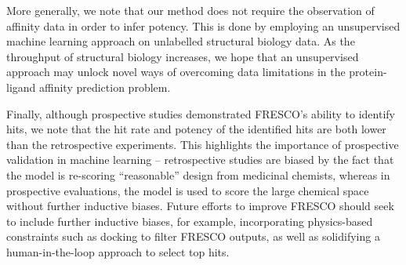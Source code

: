 
More generally, we note that our method does not require the observation of affinity data in order to infer potency. This is done by employing an unsupervised machine learning approach on unlabelled structural biology data. As the throughput of structural biology increases, we hope that an unsupervised approach may unlock novel ways of overcoming data limitations in the protein-ligand affinity prediction problem.

Finally, although prospective studies demonstrated FRESCO's ability to identify hits, we note that the hit rate and potency of the identified hits are both lower than the retrospective experiments. This highlights the importance of prospective validation in machine learning -- retrospective studies are biased by the fact that the model is re-scoring ``reasonable'' design from medicinal chemists, whereas in prospective evaluations, the model is used to score the large chemical space without further inductive biases. Future efforts to improve FRESCO should seek to include further inductive biases, for example, incorporating physics-based constraints such as docking to filter FRESCO outputs, as well as solidifying a human-in-the-loop approach to select top hits. 
